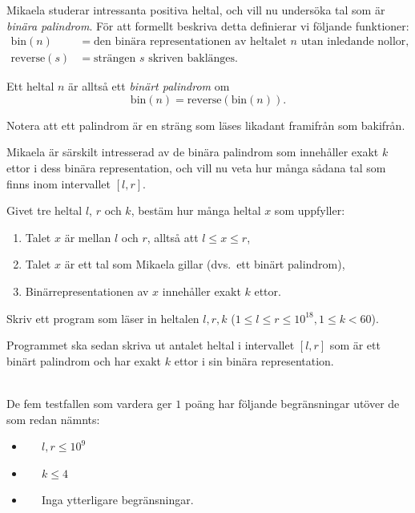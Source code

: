 Mikaela studerar intressanta positiva heltal, och vill nu undersöka tal som är \emph{binära palindrom}. 
För att formellt beskriva detta definierar vi följande funktioner:
\begin{align*}
\text{bin}(n) &= \text{den binära representationen av heltalet } n \text{ utan inledande nollor},\\
\text{reverse}(s) &= \text{strängen } s \text{ skriven baklänges}.
\end{align*}



Ett heltal $n$ är alltså ett \emph{binärt palindrom} om
\[
\text{bin}(n) = \text{reverse}(\text{bin}(n)).
\]

Notera att ett palindrom är en sträng som läses likadant framifrån som bakifrån.


Mikaela är särskilt intresserad av de binära palindrom som innehåller exakt $k$ ettor i dess binära representation, 
och vill nu veta hur många sådana tal som finns inom intervallet $[l,r]$.

Givet tre heltal $l$, $r$ och $k$, bestäm hur många heltal $x$ som uppfyller:
\begin{enumerate}
    \item Talet $x$ är mellan $l$ och $r$, alltså att $l \leq x \leq r$,
    \item Talet $x$ är ett tal som Mikaela gillar (dvs.\ ett binärt palindrom),
    \item Binärrepresentationen av $x$ innehåller exakt $k$ ettor.
\end{enumerate}

Skriv ett program som läser in heltalen $l, r, k$ ($1 \leq l \leq r \leq 10^{18}, 1 \leq k < 60$).

Programmet ska sedan skriva ut antalet heltal i intervallet $[l, r]$ som är ett binärt palindrom och har exakt $k$ ettor i sin binära representation.

\\
De fem testfallen som vardera ger $1$ poäng har följande begränsningar utöver de som redan nämnts:
\begin{itemize}
    \item[(1)] $\;\;\;\;$ $l,r \leq 10^9$
    \item[(2)] $\;\;\;\;$ $k \leq 4$
    \item[(3-5)] $\;\;\;\; $ Inga ytterligare begränsningar.
\end{itemize}

\vspace{2cm}

